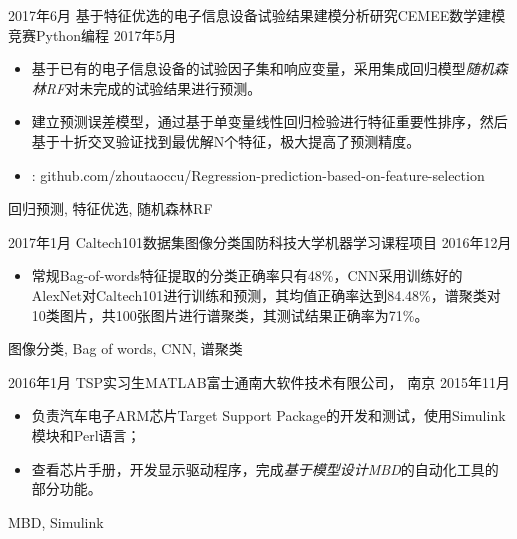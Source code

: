 %
%


 
\begin{experiences}

  \experience
  {2017年6月} {基于特征优选的电子信息设备试验结果建模分析研究}{CEMEE数学建模竞赛}{Python编程}
  {2017年5月 } {
				  	\begin{itemize}
				  		\item  基于已有的电子信息设备的试验因子集和响应变量，采用集成回归模型\emph{随机森林RF}对未完成的试验结果进行预测。
				  		\item 建立预测误差模型，通过基于单变量线性回归检验进行特征重要性排序，然后基于十折交叉验证找到最优解N个特征，极大提高了预测精度。
						\item \faGithub:  {github.com/zhoutaoccu/Regression-prediction-based-on-feature-selection}
				  	\end{itemize}
				  }
				  {回归预测, 特征优选, 随机森林RF}

  \emptySeparator
  \experience
  {2017年1月} {Caltech101数据集图像分类}{国防科技大学}{机器学习课程项目}
  {2016年12月}    {
				  	\begin{itemize}
				  		\item 常规Bag-of-words特征提取的分类正确率只有48\%，CNN采用训练好的AlexNet对Caltech101进行训练和预测，其均值正确率达到84.48\%，谱聚类对10类图片，共100张图片进行谱聚类，其测试结果正确率为71\%。
				  	\end{itemize}
				  }
				  {图像分类, Bag of words, CNN, 谱聚类}

  \emptySeparator			
  \experience
  {2016年1月} {TSP实习生}{MATLAB}{富士通南大软件技术有限公司， 南京}
  {2015年11月}    {
  	\begin{itemize}
  		\item  负责汽车电子ARM芯片Target Support Package的开发和测试，使用Simulink模块和Perl语言；
  		\item  查看芯片手册，开发显示驱动程序，完成\emph{基于模型设计MBD}的自动化工具的部分功能。
  	\end{itemize}
  }
  {MBD, Simulink}


\end{experiences}
